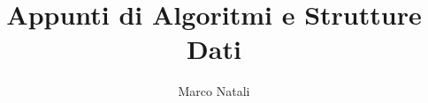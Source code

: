 \documentclass[a4paper]{report}
\begin{document}
\title{Appunti di Algoritmi e Strutture Dati}
\author{Marco Natali}
\maketitle

\end{document}
